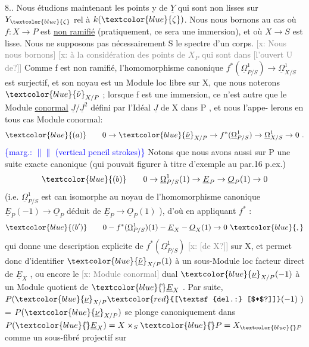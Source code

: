 \documentclass[11pt]{article}
\newcommand{\scanpage}[1]{\par\bigskip\noindent{\small\sffamily[scan #1]}\par}
\newcommand{\mspage}[1]{{\small\sffamily[p.\,#1]}}
\newcommand{\hand}[1]{\textcolor{blue}{#1}}
\let\over\relax
\newcommand{\over}[2]{\textcolor{gray}{#1}\textcolor{blue}{\ensuremath{^{\!\nearrow}}#2}}
\newcommand{\margin}[1]{\textcolor{blue}{\{\textsf{marg.:} #1\}}}
\newcommand{\deleted}[1]{\textcolor{red}{[\textsf{del.:} #1]}}
\newcommand{\xout}[1]{\textcolor{gray}{[\textsf{x:} #1]}}
\newcommand{\uline}[1]{\underline{#1}}
\newcommand{\unsure}[1]{[#1?]}
\begin{document}
\clearpage
\scanpage{25/37}
\mspage{\hand{\unsure{39|33}}}

8.\over{3}{4}. Nous étudions maintenant les points  y de $\underline{Y}$ qui sont non lisses
sur $Y_{\hand{\zeta}}$ rel à $k(\hand{\zeta})$. Nous nous  bornons au cas où  $f:X\to P$  est \uline{non ramifié}
(pratiquement, ce sera une immersion), et où $X\to S$ est lisse.  Nous ne
supposons pas nécessairement S le spectre d'un corps.  \xout{Nous nous bornons}
\xout{à la considération des points de $X_P$ qui sont dans \unsure{l'ouvert U de}} Comme
f  est non ramifié, l'homomorphisme canonique   $f^*(\underline{\Omega}^1_{P/S})\to\underline{\Omega}^1_{X/S}$
est surjectif, et son noyau est un Module loc libre sur X, que nous
noterons  $\hand{\check{\nu}}_{X/P}$ ; lorsque f est une immersion, ce n'est autre que le
Module \uline{conormal}  $\underline{J}/\underline{J}^2$  défini par l'Idéal $\underline{J}$ de X dans P , et nous l'appe-%
lerons en tous cas Module conormal:
\[ \hand{(a)} \qquad 0\to\hand{\check{\underline{\nu}}}_{X/P}\to f^*(\underline{\Omega}^1_{P/S})\to\underline{\Omega}^1_{X/S}\to 0 \ . \]
\margin{$\|\|$ (vertical pencil strokes)} Notons que nous avons aussi sur  P  une suite exacte canonique
(qui pouvait figurer à titre d'exemple au par.16 p.ex.)
\[ \hand{(b)} \qquad 0\to\underline{\Omega}^1_{P/S}(1)\to\underline{E}_P\to\underline{O}_P(1)\to 0 \]
(i.e. $\underline{\Omega}^1_{P/S}$ est can isomorphe au noyau de l'homomorphisme canonique
$\underline{E}_P(-1)\to\underline{O}_P$  déduit de $\underline{E}_P\to\underline{O}_P(1)$ ), d'où en appliquant $f^*$ :
\[ \hand{(b')} \qquad 0 - f^*(\underline{\Omega}^1_{P/S})(1) - \underline{E}_X - \underline{O}_X(1)\to 0 \ \hand{,} \]
qui donne une description explicite de  $f^*(\underline{\Omega}^1_{P/S})$  \xout{\unsure{de X}} sur X, et
permet  donc d'identifier $\hand{\check{\underline{\nu}}}_{X/P}(1)$  à un sous-Module loc facteur direct
de $\underline{E}_X$ , ou encore le \xout{Module conormal} dual  $\hand{\underline{\nu}}_{X/P}(-1)$  à un Module
quotient de $\hand{\check{}}\underline{E}_X$ .  Par suite,   $P(\hand{\underline{\nu}}_{X/P}\deleted{\unsure{$*$}}(-1)\ )$  =  $P(\hand{\underline{\nu}}_{X/P})$  se plonge
canoniquement dans  $P(\hand{\check{}}\underline{E}_X) = X\times_S\hand{\check{}}P = X_{\hand{\check{}}P}$ comme un sous-fibré projectif sur
\end{document}
